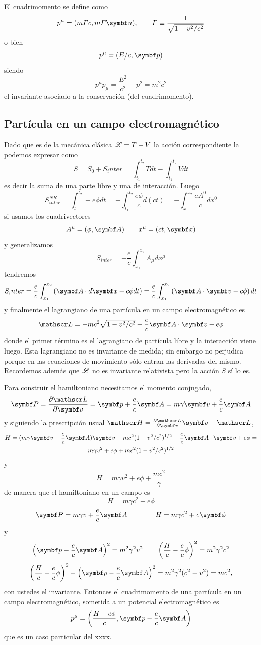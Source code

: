 \documentclass[10pt,oneside]{CBFT_book}
\begin{document}
El cuadrimomento se define como 
\[
	p^\mu = ( m\Gamma c , m \Gamma \vb {u}), \qquad \Gamma \equiv \frac{ 1 }{ \sqrt{ 1 - v^2/c^2 } } 
\]
o bien 
\[
	p^\mu = ( E/c , \vb{p} )
\]
siendo 
\[
	p^\mu p_\mu = \frac{E^2}{c^2} - p^2 = m^2 c^2
\]
el invariante asociado a la conservación (del cuadrimomento).

\subsection{Partícula en un campo electromagnético}

Dado que es de la mecánica clásica $\mathscr{L} = T - V$ la acción correspondiente la podemos expresar  como 
\[
	S = S_0 + S_inter = \int_{t_1}^{t_2} T dt - \int_{t_1}^{t_2} V dt
\]
es decir la suma de una parte libre y una de interacción. Luego 
\[
	S_{inter}^{NR} = \int_{t_1}^{t_2} -e \phi dt =  -\int_{t_1}^{t_2} \frac{ e \phi }{c} d(ct) = 
		-\int_{x_1}^{x_2} \frac{ e A^0 }{c} dx^0
\]
si usamos los cuadrivectores 
\[
	A^\mu = ( \phi, \vb{A} ) \qquad x^\mu = ( ct, \vb{x} ) 
\]
y generalizamos 
\[
	S_{inter} = - \frac{e}{c} \int_{x_1}^{x_2} A_\mu dx^\mu
\]
tendremos 
\[
	S_inter = \frac{e}{c} \int_{x_1}^{x_2} \left( \vb{A}\cdot d\vb{x} - c \phi dt \right) = 
		\frac{e}{c} \int_{x_1}^{x_2} \left( \vb{A}\cdot\vb{v} - c \phi \right) dt
\]
y finalmente el lagrangiano de una partícula en un campo electromagnético es 
\[
	\Lag = - m c^2 \sqrt{ 1 - v^2/c^2 } + \frac{e}{c} \pe{A}{v} - e \phi
\]
donde el primer término es el lagrangiano de partícula libre y la interacción viene luego. Esta lagrangiano 
no es invariante de medida; sin embargo no perjudica porque en las ecuaciones de movimiento sólo entran las
derivadas del mismo. Recordemos además que $\mathscr{L}$ no es invariante relativista pero la acción $S$ sí lo es.

Para construir el hamiltoniano necesitamos el momento conjugado,
\[
	\vb{P} = \dpar{\Lag}{\vb{v}} = \vb{p} + \frac{e}{c}\vb{A} = m\gamma \vb{v} + \frac{e}{c}\vb{A}
\]
y siguiendo la prescripción usual $\Ham = \dpar{\Lag}{\vb{v}}\vb{v} -\Lag $,
\begin{multline*}
	H = ( m\gamma \vb{v} + \frac{e}{c}\vb{A} )\vb{v} + mc^2(1-v^2/c^2)^{1/2} -
		\frac{e}{c}\pe{A}{v} + e\phi = \\
		m\gamma v^2 + e\phi + mc^2(1 - v^2/c^2)^{1/2}
\end{multline*}
y 
\[
	H =  m \gamma v^2 + e\phi + \frac{m c^2}{\gamma}  
\]
de manera que el hamiltoniano en un campo es 
\[
	H = m \gamma c^2 + e \phi
\]
\[
	\vb{P} = m \gamma v + \frac{e}{c} \vb{A} \qquad \qquad H = m \gamma c^2 + e \vb{\phi}
\]
y
\[
	\left( \vb{p} - \frac{e}{c}\vb{A} \right)^2 = m^2 \gamma^2 v^2 \qquad 
	\left( \frac{H}{c} - \frac{e}{c}\phi \right)^2 = m^2 \gamma^2 c^2
\]
\[
	\left( \frac{H}{c} - \frac{e}{c}\phi \right)^2 - \left( \vb{p} - \frac{e}{c}\vb{A} \right)^2 =
	m^2 \gamma^2 ( c^2 - v^2 ) = mc^2,
\]
con ustedes el invariante. Entonces el cuadrimomento de una partícula en un campo electromagnético,
sometida a un potencial electromagnético es 
\[
	p^\mu = \left( \frac{H-e\phi}{c}, \vb{p} - \frac{e}{c}\vb{A} \right)
\]
que es un caso particular del xxxx.
\end{document}

